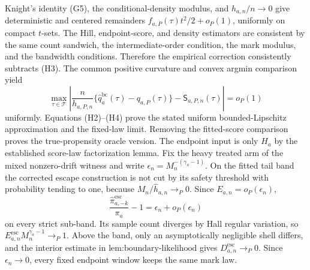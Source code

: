 Knight's identity (G5), the conditional-density modulus, and \(h_{a,n}/n\to0\) give deterministic and centered remainders \(f_{a,P}(\tau)t^2/2+o_P(1)\), uniformly on compact \(t\)-sets.  The Hill, endpoint-score, and density estimators are consistent by the same count sandwich, the intermediate-order condition, the mark modulus, and the bandwidth conditions.  Therefore the empirical correction consistently subtracts (H3).  The common positive curvature and convex argmin comparison yield
\[
 \max_{\tau\in\mathcal T}\left|
 \frac n{h_{a,P,n}}\{\widehat q_a^{\mathrm{bc}}(\tau)-q_{a,P}(\tau)\}
 -\mathsf S_{a,P,n}(\tau)\right|=o_P(1)
\tag{H4}
\]
uniformly.  Equations (H2)--(H4) prove the stated uniform bounded-Lipschitz approximation and the fixed-law limit.  Removing the fitted-score comparison proves the true-propensity oracle version.  The endpoint input is only \(H_a\) by the established score-law factorization lemma.
Fix the heavy treated arm of the mixed nonzero-drift witness and write \(\epsilon_n=M_n^{-(\gamma_a-1)}\).  On the fitted tail band the corrected escape construction is not cut by its safety threshold with probability tending to one, because \(M_n/\widehat h_{a,n}\to_P0\).  Since \(E_{a,n}=o_P(\epsilon_n)\),
\[
 \frac{\widehat\pi^{\mathrm{esc}}_{a,-k}}{\pi_a}-1
 =\epsilon_n+o_P(\epsilon_n)
\]
on every strict sub-band.  Its sample count diverges by Hall regular variation, so \(E^{\mathrm{esc}}_{a,n}M_n^{\gamma_a-1}\to_P1\).  Above the band, only an asymptotically negligible shell differs, and the interior estimate in \(\text{lem:boundary-likelihood}\) gives \(D^{\mathrm{esc}}_{a,n}\to_P0\).  Since \(\epsilon_n\to0\), every fixed endpoint window keeps the same mark law.

